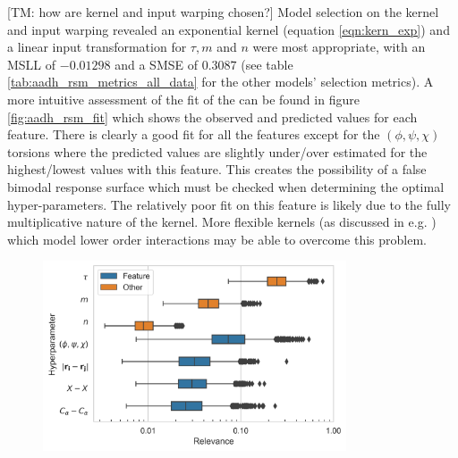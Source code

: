 [TM: how are kernel and input warping chosen?] Model selection on the kernel and input warping revealed an exponential kernel (equation \ref{eqn:kern_exp}) and a linear input transformation for $\tau, m$ and $n$ were most appropriate, with an MSLL of $-0.01298$ and a SMSE of $0.3087$ (see table \ref{tab:aadh_rsm_metrics_all_data} for the other models' selection metrics). A more intuitive assessment of the fit of the can be found in figure  \ref{fig:aadh_rsm_fit} which shows the observed and predicted values for each feature. There is clearly a good fit for all the features except for the $(\phi, \psi, \chi)$ torsions where the predicted values are slightly under/over estimated for the highest/lowest values with this feature. This creates the possibility of a false bimodal response surface which must be checked when determining the optimal hyper-parameters.  The relatively poor fit on this feature is likely due to the fully multiplicative nature of the kernel. More flexible kernels (as discussed in e.g. \cite{duvenaud2011additive}) which model lower order interactions may be able to overcome this problem. 

\begin{figure}
    \centering
    \includegraphics[width=0.8\textwidth]{chapters/msm_optimization/figures/AADH_relevance_d.png}
    \label{fig:aadh_relevance}
\end{figure}

